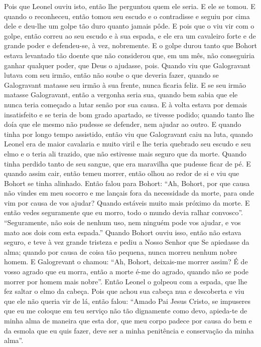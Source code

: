 Pois que Leonel ouviu isto, então lhe perguntou quem ele seria. E ele se tomou.
E quando o reconheceu, então tomou seu escudo e o contradisse e seguiu por cima
dele e deu-lhe um golpe tão duro quanto jamais pôde. E pois que o viu vir com o
golpe, então correu ao seu escudo e à sua espada, e ele era um cavaleiro forte
e de grande poder e defendeu-se, à vez, nobremente. E o golpe durou tanto que
Bohort estava levantado tão doente que não considerou que, em um mês, não
conseguiria ganhar qualquer poder, que Deus o ajudasse, pois. Quando viu que
Galogravant lutava com seu irmão, então não soube o que deveria fazer, quando
se Galogravant matasse seu irmão à sua frente, nunca ficaria feliz. E se seu
irmão matasse Galogravant, então a vergonha seria sua, quando bem sabia que ele
nunca teria começado a lutar senão por sua causa. E à volta estava por demais
insatisfeito e se teria de bom grado apartado, se tivesse podido; quando tanto
lhe doía que ele mesmo não pudesse se defender, nem ajudar ao outro. E quando
tinha por longo tempo assistido, então viu que Galogravant caiu na luta, quando
Leonel era de maior cavalaria e muito viril e lhe teria quebrado seu escudo e
seu elmo e o teria ali trazido, que não estivesse mais seguro que da morte.
Quando tinha perdido tanto de seu sangue, que era maravilha que pudesse ficar
de pé. E quando assim cair, então temeu morrer, então olhou ao redor de si e
viu que Bohort se tinha alinhado. Então falou para Bohort: “Ah, Bohort, por que
causa não vindes em meu socorro e me lançais fora da necessidade da morte, para
onde vim por causa de vos ajudar? Quando estáveis muito mais próximo da morte.
E então vedes seguramente que eu morro, todo o mundo devia ralhar convosco”.
“Seguramente, não sois de nenhum uso, nem ninguém pode vos ajudar, e vos mato
aos dois com esta espada.” Quando Bohort ouviu isso, então não estava seguro, e
teve à vez grande tristeza e pediu a Nosso Senhor que Se apiedasse da alma;
quando por causa de coisa tão pequena, nunca morreu nenhum nobre homem. E
Galogrevant o chamou: “Ah, Bohort, deixais-me morrer assim? É de vosso agrado
que eu morra, então a morte é-me do agrado, quando não se pode morrer por homem
mais nobre”. Então Leonel o golpeou com a espada, que lhe fez saltar o
elmo da cabeça. Pois que achou sua cabeça nua e descoberta e viu que ele não
queria vir de lá, então falou: “Amado Pai Jesus Cristo, se impuseres que eu me
coloque em teu serviço não tão dignamente como devo, apieda-te de minha alma de
maneira que esta dor, que meu corpo padece por causa do bem e da esmola que eu
quis fazer, deve ser a minha penitência e conservação da minha alma”.

